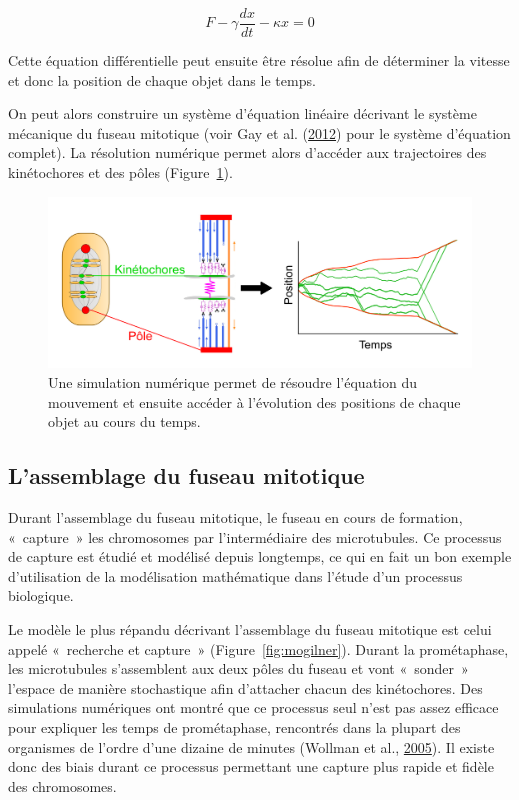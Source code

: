 \documentclass[12pt,a4paper,twoside,openright]{book}
\begin{document}
\[
F - \gamma\frac{dx}{dt} - \kappa x = 0
\]

Cette équation différentielle peut ensuite être résolue afin de
déterminer la vitesse et donc la position de chaque objet dans le temps.

On peut alors construire un système d'équation linéaire décrivant le
système mécanique du fuseau mitotique (voir Gay et al.
(\protect\hyperlink{ref-Gay2012a}{2012}) pour le système d'équation
complet). La résolution numérique permet alors d'accéder aux
trajectoires des kinétochores et des pôles
(Figure~\ref{fig:traj_model}).

\begin{figure}[htbp]
\centering
\includegraphics{figures/intro/traj_model.png}
\caption{\label{fig:traj_model}Une simulation numérique permet de
résoudre l'équation du mouvement et ensuite accéder à l'évolution des
positions de chaque objet au cours du temps.}
\end{figure}

\subsection{L'assemblage du fuseau
mitotique}\label{lassemblage-du-fuseau-mitotique}

Durant l'assemblage du fuseau mitotique, le fuseau en cours de
formation, «~capture~» les chromosomes par l'intermédiaire des
microtubules. Ce processus de capture est étudié et modélisé depuis
longtemps, ce qui en fait un bon exemple d'utilisation de la
modélisation mathématique dans l'étude d'un processus biologique.

Le modèle le plus répandu décrivant l'assemblage du fuseau mitotique est
celui appelé «~recherche et capture~» (Figure~\ref{fig:mogilner}).
Durant la prométaphase, les microtubules s'assemblent aux deux pôles du
fuseau et vont «~sonder~» l'espace de manière stochastique afin
d'attacher chacun des kinétochores. Des simulations numériques ont
montré que ce processus seul n'est pas assez efficace pour expliquer les
temps de prométaphase, rencontrés dans la plupart des organismes de
l'ordre d'une dizaine de minutes (Wollman et al.,
\protect\hyperlink{ref-Wollman2005}{2005}). Il existe donc des biais
durant ce processus permettant une capture plus rapide et fidèle des
chromosomes.
\end{document}
